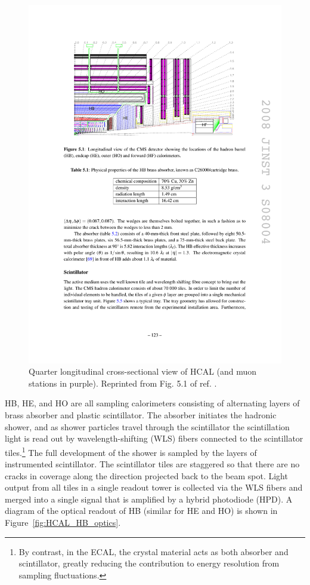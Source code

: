\documentclass[dissertation.tex]{subfiles}
\begin{document}
\begin{figure}
	\centering
	\includegraphics[scale=1.0]{HCAL_longitudinal_xsec}
	\caption{Quarter longitudinal cross-sectional view of HCAL (and muon stations in purple).  Reprinted from Fig. 5.1 of ref. \cite{1748-0221-3-08-S08004}.}
	\label{fig:HCAL_longitudinal_xsec}
\end{figure}

HB, HE, and HO are all sampling calorimeters consisting of alternating layers of brass absorber and plastic scintillator.  The absorber initiates the hadronic shower, and as shower particles travel through the scintillator the scintillation light is read out by wavelength-shifting (WLS) fibers connected to the scintillator tiles.\footnote{By contrast, in the ECAL, the crystal material acts as both absorber and scintillator, greatly reducing the contribution to energy resolution from sampling fluctuations.}  The full development of the shower is sampled by the layers of instrumented scintillator.  The scintillator tiles are staggered so that there are no cracks in coverage along the direction projected back to the beam spot.  Light output from all tiles in a single readout tower is collected via the WLS fibers and merged into a single signal that is amplified by a hybrid photodiode (HPD).  A diagram of the optical readout of HB (similar for HE and HO) is shown in Figure~\ref{fig:HCAL_HB_optics}.
\end{document}

